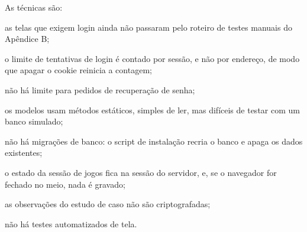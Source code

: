 As técnicas são:

\begin{alineasIFTO}
  \item as telas que exigem login ainda não passaram pelo roteiro de testes manuais do Apêndice B;
  \item o limite de tentativas de login é contado por sessão, e não por endereço, de modo que apagar o cookie reinicia a contagem;
  \item não há limite para pedidos de recuperação de senha;
  \item os modelos usam métodos estáticos, simples de ler, mas difíceis de testar com um banco simulado;
  \item não há migrações de banco: o script de instalação recria o banco e apaga os dados existentes;
  \item o estado da sessão de jogos fica na sessão do servidor, e, se o navegador for fechado no meio, nada é gravado;
  \item as observações do estudo de caso não são criptografadas;
  \item não há testes automatizados de tela.
\end{alineasIFTO}
